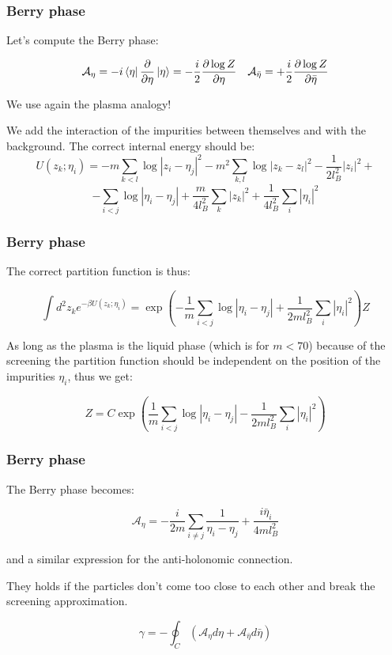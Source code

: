 \documentclass{beamer}
\begin{document}
\begin{frame}
\frametitle{Berry phase}
\begin{center}

Let's compute the Berry phase:

\[
\mathcal{A}_{\mathbf{\eta}} = - i \bra{\mathbf{\eta}} \frac{\partial}{\partial \eta} \ket{\mathbf{\eta}} = -\frac{i}{2} \frac{\partial \log Z}{\partial \eta} \quad \mathcal{A}_{\bar{\eta}} = +\frac{i}{2} \frac{\partial \log Z}{\partial \bar{\eta}}
\]

We use again the plasma analogy!


We add the interaction of the impurities between themselves and with the background. The correct internal energy should be:
\[
U(z_k; \eta_i) =  - m \sum_{k < l} \log | z_i - \eta_j|^2 - m^2 \sum_{k, l} \log |z_k - z_l|^2 - \frac{1}{2 l_B^2} |z_i|^2 +
\]
\[
-\sum_{i < j} \log | \eta_i - \eta_j| + \frac{m}{4 l_B^2} \sum_k |z_k|^2 + \frac{1}{4 l_B^2} \sum_i |\eta_i|^2
\]

\end{center}
\end{frame}

\begin{frame}
\frametitle{Berry phase}
\begin{center}

The correct partition function is thus:

\[
\int d^2 z_k e^{- \beta U(z_k; \eta_i)} = \exp \left( - \frac{1}{m}\sum_{i < j} \log | \eta_i - \eta_j| + \frac{1}{2 m l_B^2} \sum_i |\eta_i|^2 \right) Z
\]

As long as the plasma is the liquid phase (which is for $m < 70$) because of the screening the partition function should be independent on the position of the impurities $\eta_i$, thus we get:

\[
Z = C \exp \left( \frac{1}{m}\sum_{i < j} \log | \eta_i - \eta_j| - \frac{1}{2 m l_B^2} \sum_i |\eta_i|^2 \right)
\]

\end{center}
\end{frame}

\begin{frame}
\frametitle{Berry phase}
\begin{center}
The Berry phase becomes:

\[
\mathcal{A}_{\eta} = - \frac{i}{2 m} \sum_{i \neq j} \frac{1}{\eta_i - \eta_j} + \frac{i \bar{\eta}_i}{4 m l_B^2} 
\]

and a similar expression for the anti-holonomic connection.

They holds if the particles don't come too close to each other and break the screening approximation.

\[
\gamma = - \oint_{C} \left( \mathcal{A}_{\eta} d \eta  + \mathcal{A}_{\bar{\eta}} d \bar{\eta} \right) 
\]

\end{center}
\end{frame}
\end{document}
